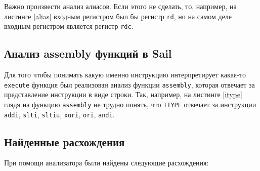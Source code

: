 Важно произвести анализ алиасов.
Если этого не сделать, то, например, на листинге \ref{alias} входным регистром был бы регистр \texttt{rd}, но на самом деле входным регистром является регистр \texttt{rdc}.

\subsection{Анализ assembly функций в Sail}

Для того чтобы понимать какую именно инструкцию интерпретирует какая-то \texttt{execute} функция был реализован анализ функции \texttt{assembly}, которая отвечает за представление инструкции в виде строки.
Так, например, на листинге \ref{itype} глядя на функцию \texttt{assembly} не трудно понять, что \texttt{ITYPE} отвечает за инструкции \texttt{addi}, \texttt{slti}, \texttt{sltiu}, \texttt{xori}, \texttt{ori}, \texttt{andi}.


\subsection{Найденные расхождения}

При помощи анализатора были найдены следующие расхождения:

